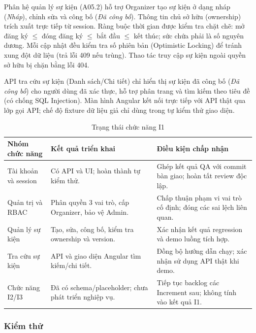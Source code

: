 
Phân hệ quản lý sự kiện (A05.2) hỗ trợ Organizer tạo sự kiện ở dạng nháp (\textit{Nháp}), chỉnh sửa và công bố (\textit{Đã công bố}). Thông tin chủ sở hữu (ownership) trích xuất trực tiếp từ session. Ràng buộc thời gian được kiểm tra chặt chẽ: mở đăng ký $\le$ đóng đăng ký $\le$ bắt đầu $\le$ kết thúc; sức chứa phải là số nguyên dương. Mỗi cập nhật đều kiểm tra số phiên bản (Optimistic Locking) để tránh xung đột dữ liệu (trả lỗi 409 nếu trùng). Thao tác truy cập sự kiện ngoài quyền sở hữu bị chặn bằng lỗi 404.

API tra cứu sự kiện (Danh sách/Chi tiết) chỉ hiển thị sự kiện đã công bố (\textit{Đã công bố}) cho người dùng đã xác thực, hỗ trợ phân trang và tìm kiếm theo tiêu đề (có chống SQL Injection). Màn hình Angular kết nối trực tiếp với API thật qua lớp gọi API; chế độ fixture dữ liệu giả chỉ dùng trong tự kiểm thử giao diện.

\begin{table}[H]
\centering\small
\caption{Trạng thái chức năng I1}\label{tab:i1-scope}
\begin{tabularx}{\linewidth}{@{}p{.18\linewidth}XX@{}}
\toprule
\textbf{Nhóm chức năng} & \textbf{Kết quả triển khai} & \textbf{Điều kiện chấp nhận}\\\midrule
Tài khoản và session & Có API và UI; hoàn thành tự kiểm thử. & Ghép kết quả QA với commit bàn giao; hoàn tất review độc lập.\\
Quản trị và RBAC & Phân quyền 3 vai trò, cấp Organizer, bảo vệ Admin. & Chấp thuận phạm vi vai trò cố định; đóng các sai lệch liên quan.\\
Quản lý sự kiện & Tạo, sửa, công bố, kiểm tra ownership và version. & Xác nhận kết quả regression và demo luồng tích hợp.\\
Tra cứu sự kiện & API và giao diện Angular tìm kiếm/chi tiết. & Đồng bộ hướng dẫn chạy; xác nhận sử dụng API thật khi demo.\\
Chức năng I2/I3 & Đã có schema/placeholder; chưa phát triển nghiệp vụ. & Tiếp tục backlog các Increment sau; không tính vào kết quả I1.\\
\bottomrule
\end{tabularx}
\end{table}

\subsubsection{Kiểm thử}

